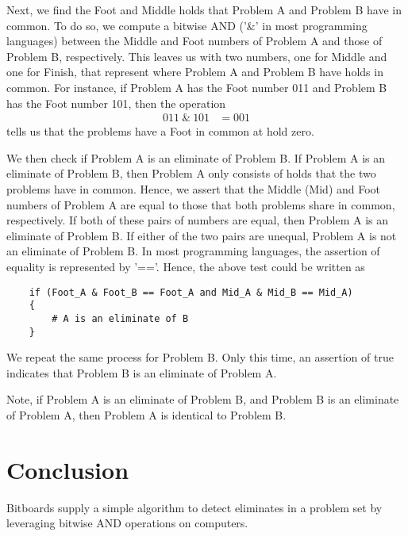 \documentclass{article}
\begin{document}
Next, we find the Foot and Middle holds that Problem A and Problem B have in common.
To do so, we compute a bitwise AND ('\&' in most programming languages) between 
the Middle and Foot numbers of Problem A and those of Problem B,
respectively. This leaves us with two numbers, one for Middle and one for Finish, that
represent where Problem A and Problem B have holds in common. For instance, 
if Problem A has the Foot number 011 and Problem B has the Foot number 101,
then the operation
\begin{align*}
    011 \ \& \ 101 &= 001
\end{align*} 
tells us that the problems have a Foot in common at hold zero. 

We then check if Problem A is an eliminate of Problem B. 
If Problem A is an eliminate of Problem B, then Problem A only consists of holds that 
the two problems have in common. Hence, we assert that the Middle (Mid) and Foot numbers of
Problem A are equal to those that both problems share in common, 
respectively. If both of these pairs of numbers are equal, then Problem A is
an eliminate of Problem B. If either of the two pairs are unequal, 
Problem A is not an eliminate of Problem B. 
In most programming languages, the assertion of equality is represented by '=='. 
Hence, the above test could be written as

\begin{verbatim}
    if (Foot_A & Foot_B == Foot_A and Mid_A & Mid_B == Mid_A) 
    { 
        # A is an eliminate of B 
    }
\end{verbatim}
 
We repeat the same process for Problem B. Only this time, an assertion of true 
indicates that Problem B is an eliminate of Problem A. 

Note, if Problem A is an eliminate of Problem B, and Problem B is an eliminate of Problem A, 
then Problem A is identical to Problem B. 

\section{Conclusion}
Bitboards supply a simple algorithm to detect eliminates in a problem set by leveraging
bitwise AND operations on computers. 
\end{document}
